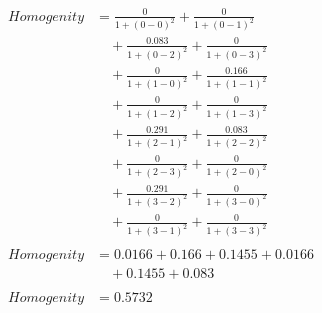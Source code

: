 \begin{align*}
Homogenity &= 
\frac{0}{1 + (0 - 0)^2} + \frac{0}{1 + (0 - 1)^2} \\
&\quad + \frac{0.083}{1 + (0 - 2)^2} + \frac{0}{1 + (0 - 3)^2} \\
&\quad + \frac{0}{1 + (1 - 0)^2} + \frac{0.166}{1 + (1 - 1)^2} \\
&\quad + \frac{0}{1 + (1 - 2)^2} + \frac{0}{1 + (1 - 3)^2} \\
&\quad + \frac{0.291}{1 + (2 - 1)^2} + \frac{0.083}{1 + (2 - 2)^2} \\
&\quad + \frac{0}{1 + (2 - 3)^2} + \frac{0}{1 + (2 - 0)^2} \\
&\quad + \frac{0.291}{1 + (3 - 2)^2} + \frac{0}{1 + (3 - 0)^2} \\
&\quad + \frac{0}{1 + (3 - 1)^2} + \frac{0}{1 + (3 - 3)^2} \\
\\
Homogenity &= 0.0166 + 0.166 + 0.1455 + 0.0166 \\
&\quad + 0.1455 + 0.083 \\
\\
Homogenity &= 0.5732
\end{align*}



